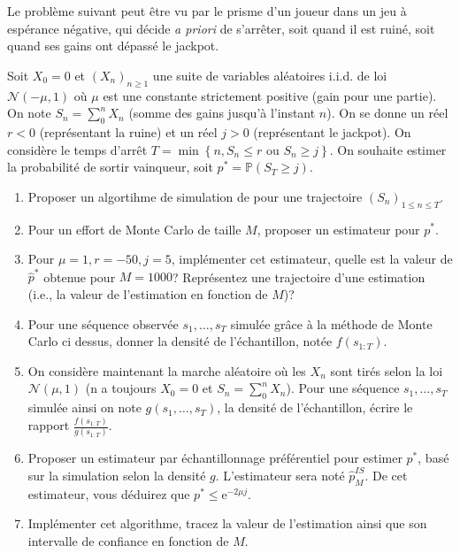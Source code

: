 \documentclass[]{article}
\begin{document}
Le problème suivant peut être vu par le prisme d'un joueur dans un jeu à
espérance négative, qui décide \emph{a priori} de s'arrêter, soit quand
il est ruiné, soit quand ses gains ont dépassé le jackpot.

Soit \(X_0 = 0\) et \((X_n)_{n\geq 1}\) une suite de variables
aléatoires i.i.d. de loi \(\mathcal{N}(-\mu, 1)\) où \(\mu\) est une
constante strictement positive (gain pour une partie). On note
\(S_n = \sum_{0}^n X_n\) (somme des gains jusqu'à l'instant \(n\)). On
se donne un réel \(r < 0\) (représentant la ruine) et un réel \(j > 0\)
(représentant le jackpot). On considère le temps d'arrêt
\(T = \min\left\lbrace n, S_n \leq r \text{ ou } S_n \geq j\right\rbrace\).
On souhaite estimer la probabilité de sortir vainqueur, soit
\(p^* = \mathbb{P}(S_T \geq j)\).

\begin{enumerate}
\def\labelenumi{\arabic{enumi}.}
\item
  Proposer un algortihme de simulation de pour une trajectoire
  \((S_n)_{1\leq n \leq T}\).
\item
  Pour un effort de Monte Carlo de taille \(M\), proposer un estimateur
  pour \(p^*\).
\item
  Pour \(\mu =1, r = -50, j = 5\), implémenter cet estimateur, quelle
  est la valeur de \(\hat{p}^*\) obtenue pour \(M = 1000\)? Représentez
  une trajectoire d'une estimation (i.e., la valeur de l'estimation en
  fonction de \(M\))?
\item
  Pour une séquence observée \(s_1, \dots, s_T\) simulée grâce à la
  méthode de Monte Carlo ci dessus, donner la densité de l'échantillon,
  notée \(f(s_{1:T})\).
\item
  On considère maintenant la marche aléatoire où les \(X_n\) sont tirés
  selon la loi \(\mathcal{N}(\mu, 1)\) (n a toujours \(X_0 = 0\) et
  \(S_n = \sum_{0}^n X_n\)). Pour une séquence \(s_1, \dots, s_T\)
  simulée ainsi on note \(g(s_1, \dots, s_T)\), la densité de
  l'échantillon, écrire le rapport \(\frac{f(s_{1:T})}{g(s_{1:T})}\).
\item
  Proposer un estimateur par échantillonnage préférentiel pour estimer
  \(p^*\), basé sur la simulation selon la densité \(g\). L'estimateur
  sera noté \(\hat{p}_M^{IS}\). De cet estimateur, vous déduirez que
  \(p^* \leq \text{e}^{-2\mu j}\).
\item
  Implémenter cet algorithme, tracez la valeur de l'estimation ainsi que
  son intervalle de confiance en fonction de \(M\).
\end{enumerate}
\end{document}
